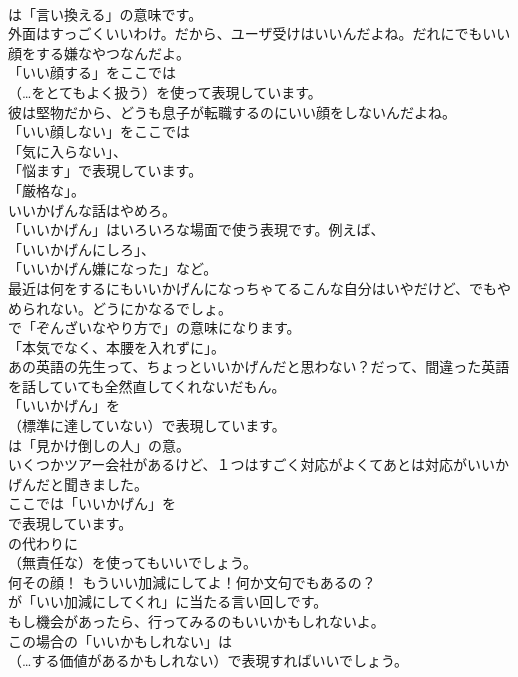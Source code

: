 \documentclass[8pt]{extreport}
\begin{document}
\begin{CJK}{UTF8}{min}
\\	は「言い換える」の意味です。	
\\	外面はすっごくいいわけ。だから、ユーザ受けはいいんだよね。だれにでもいい顔をする嫌なやつなんだよ。 
\\	「いい顔する」をここでは 
\\	（…をとてもよく扱う）を使って表現しています。	
\\	彼は堅物だから、どうも息子が転職するのにいい顔をしないんだよね。 
\\	「いい顔しない」をここでは
\\	「気に入らない」、
\\	「悩ます」で表現しています。
\\	「厳格な」。	
\\	いいかげんな話はやめろ。 
\\	「いいかげん」はいろいろな場面で使う表現です。例えば、
\\	「いいかげんにしろ」、
\\	「いいかげん嫌になった」など。	
\\	最近は何をするにもいいかげんになっちゃてるこんな自分はいやだけど、でもやめられない。どうにかなるでしょ。 
\\	で「ぞんざいなやり方で」の意味になります。
\\	「本気でなく、本腰を入れずに」。	
\\	あの英語の先生って、ちょっといいかげんだと思わない？だって、間違った英語を話していても全然直してくれないだもん。 
\\	「いいかげん」を
\\	（標準に達していない）で表現しています。
\\	は「見かけ倒しの人」の意。	
\\	いくつかツアー会社があるけど、１つはすごく対応がよくてあとは対応がいいかげんだと聞きました。 
\\	ここでは「いいかげん」を 
\\	で表現しています。
\\	の代わりに 
\\	（無責任な）を使ってもいいでしょう。	
\\	何その顔！ もういい加減にしてよ！何か文句でもあるの？ 
\\	が「いい加減にしてくれ」に当たる言い回しです。	
\\	もし機会があったら、行ってみるのもいいかもしれないよ。 
\\	この場合の「いいかもしれない」は 
\\	（…する価値があるかもしれない）で表現すればいいでしょう。	

\end{CJK}
\end{document}
